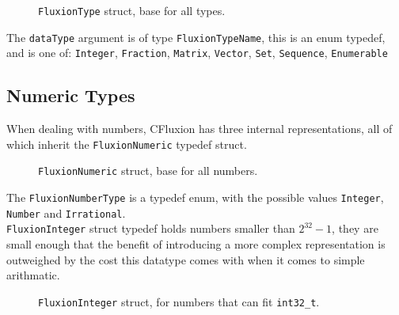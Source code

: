 \documentclass[11pt,a4paper]{article}
\newcommand{\code}[1]{\texttt{#1}}
\begin{document}
\begin{figure}[httb]
\begin{center}
\end{center}
\caption{\code{FluxionType} struct, base for all types.}
\end{figure}

The \code{dataType} argument is of type \code{FluxionTypeName}, this is an enum typedef, and is one of: \code{Integer}, \code{Fraction}, \code{Matrix}, \code{Vector}, \code{Set}, \code{Sequence}, \code{Enumerable}

\subsection{Numeric Types}

When dealing with numbers, CFluxion has three internal representations, all of which inherit the \code{FluxionNumeric} typedef struct.

\begin{figure}[httb]
\begin{center}
\end{center}
\caption{\code{FluxionNumeric} struct, base for all numbers.}
\end{figure}

The \code{FluxionNumberType} is a typedef enum, with the possible values \code{Integer}, \code{Number} and \code{Irrational}.\\

\code{FluxionInteger} struct typedef holds numbers smaller than $2^{32} - 1$, they are small enough that the benefit of introducing a more complex representation is outweighed by the cost this datatype comes with when it comes to simple arithmatic.

\begin{figure}[httb]
\begin{center}
\end{center}
\caption{\code{FluxionInteger} struct, for numbers that can fit \code{int32\_t}.}
\end{figure}
\end{document}
